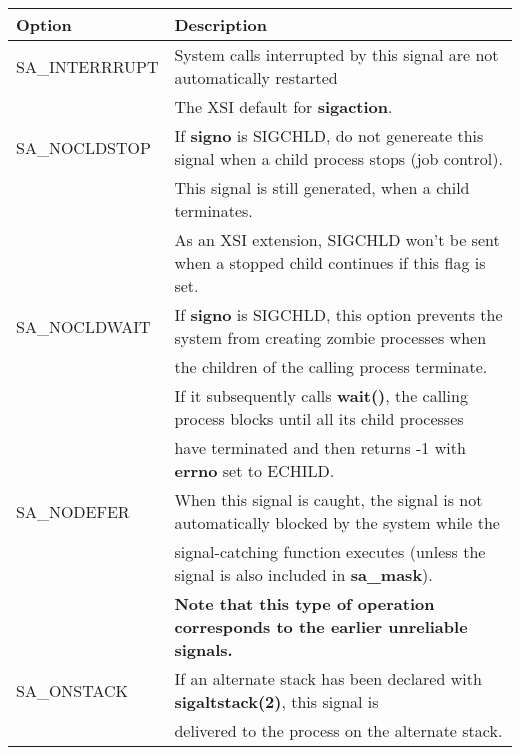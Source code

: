 \documentclass{article}
\begin{document}
\begin{center}
    \begin{table}[h!]
        \begin{tabular}{|l | l|}
            \hline
            Option          & Description \\
            \hline
            SA\_INTERRRUPT   & System calls interrupted by this signal are not automatically restarted \\
                             & The XSI default for \textbf{sigaction}. \\
            \hline

            SA\_NOCLDSTOP    & If \textbf{signo} is SIGCHLD, do not genereate this signal when a child process stops (job control). \\
                             & This signal is still generated, when a child terminates. \\
                             & As an XSI extension, SIGCHLD won't be sent when a stopped child continues if this flag is set. \\
            \hline

            SA\_NOCLDWAIT    & If \textbf{signo} is SIGCHLD, this option prevents the system from creating zombie processes when  \\
                             & the children of the calling process terminate. \\

                             & If it subsequently calls \textbf{wait()}, the calling process blocks until all its child processes \\
                             & have terminated and then returns -1 with \textbf{errno} set to ECHILD. \\
            \hline

            SA\_NODEFER      & When this signal is caught, the signal is not automatically blocked by the system while the \\ 
                             & signal-catching function executes (unless the signal is also included in \textbf{sa\_mask}). \\
                             & \textbf{Note that this type of operation corresponds to the earlier unreliable signals.} \\
            \hline

            SA\_ONSTACK      & If an alternate stack has been declared with \textbf{sigaltstack(2)}, this signal is  \\ 
                             & delivered to the process on the alternate stack. \\
            \hline


\end{tabular}
\end{table}
\end{center}
\end{document}

